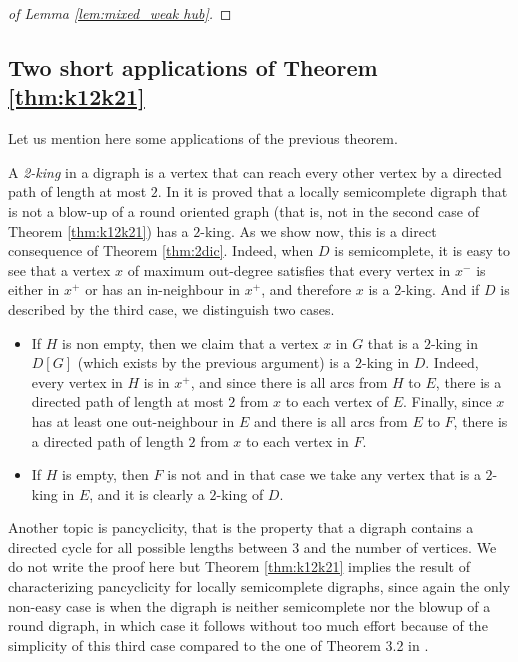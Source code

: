 \begin{proof}[of Lemma \ref{lem:mixed_weak hub}]
\end{proof}

\subsection*{Two short applications of Theorem \ref{thm:k12k21}}
Let us mention here some applications of the previous theorem. 

A {\em 2-king} in a digraph is a vertex that can reach every other vertex by a directed path of length at most $2$. In \cite{WYW} it is proved that a locally semicomplete digraph that is not a blow-up of a round oriented graph (that is, not in the second case of Theorem \ref{thm:k12k21}) has a $2$-king. As we show now, this is a direct consequence of Theorem \ref{thm:2dic}. Indeed, when $D$ is semicomplete, it is easy to see that a vertex $x$ of maximum out-degree satisfies that every vertex in $x^-$ is either in $x^+$ or has an in-neighbour in $x^+$, and therefore $x$ is a $2$-king. And if $D$ is described by the third case, we distinguish two cases. 
\begin{itemize}
\item If $H$ is non empty, then we claim that a vertex $x$ in $G$ that is a $2$-king in $D[G]$ (which exists by the previous argument) is a $2$-king in $D$. Indeed, every vertex in $H$ is in $x^+$, and since there is all arcs from $H$ to $E$, there is a directed path of length at most $2$ from $x$ to each vertex of $E$. Finally, since $x$ has at least one out-neighbour in $E$ and there is all arcs from $E$ to $F$, there is a directed path of length $2$ from $x$ to each vertex in $F$. 
\item If $H$ is empty, then $F$ is not and in that case we take any vertex that is a $2$-king in $E$, and it is clearly a $2$-king of $D$. 
\end{itemize}

Another topic is pancyclicity, that is the property that a digraph contains a directed cycle for all possible lengths between $3$ and the number of vertices. We do not write the proof here but Theorem \ref{thm:k12k21} implies the result of \cite{BGGV} characterizing pancyclicity for locally semicomplete digraphs, since again the only non-easy case is when the digraph is neither semicomplete nor the blowup of  a round digraph, in which case it follows without too much effort because of the simplicity of this third case compared to the one of Theorem 3.2 in \cite{BGGV}.

